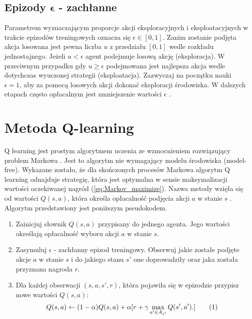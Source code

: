 \documentclass[12pt]{book}
\theoremstyle{plain}
\newcommand\addtag{\refstepcounter{equation}
\renewcommand{\labelenumii}{\theenumii}
\renewcommand{\theenumii}{\theenumi.\arabic{enumii}.}
\tag{\theequation}}
\newcommand{\myref}[1]{(\ref{#1})}
\begin{document}
\subsection*{Epizody $\mathbf{\epsilon}$ - zachłanne}
Parametrem wyznaczającym proporcje akcji eksploracyjnych i eksploatacyjnych w trakcie epizodów treningowych oznacza się $\epsilon \in [0,1]$. Zanim zostanie podjęta akcja losowana jest pewna liczba $u$ z przedziału $[0,1]$ wedle rozkładu jednostajnego. Jeżeli $u<\epsilon$ agent podejmuje losową akcję (eksploracja). W przeciwnym przypadku gdy $u \geq \epsilon$ podejmowana jest najlepsza akcja wedle dotychczas wyuczonej strategii (eksploatacja). Zazwyczaj na początku nauki $\epsilon=1$, aby za pomocą losowych akcji dokonać eksploracji środowiska. W dalszych etapach często opłacalnym jest zmniejszenie wartości $\epsilon$ \cite{epsilon_decay}.

\section{Metoda Q-learning}
Q learning jest prostym algorytmem uczenia ze wzmocnieniem rozwiązujący problem Markowa \cite{watkins}. Jest to algorytm nie wymagający modelu środowiska (model-free). Wykazane zostało\cite{q_zbieznosc}, że dla skończonych procesów Markowa algorytm Q learning odnajduje strategię, która jest optymalna w sensie maksymalizacji wartości oczekiwanej nagród \myref{eq:Markov_maximize}. Nazwa metody wzięła się od wartości $Q(s,a)$, która określa opłacalność podjęcia akcji $a$ w stanie $s$ \cite{nazwa_q}. Algorytm przedstawiony jest poniższym pseudokodem.
\begin{enumerate}
	\item Zainicjuj słownik
	$Q(s,a)$ przypisany do jednego agenta. Jego wartości określają opłacalność wyboru akcji $a$ w stanie $s$.
	\item Zasymuluj $\epsilon$ - zachłanny epizod treningowy. Obserwuj jakie zostałe podjęte akcje $a$ w stanie $s$ i do jakiego stanu $s'$ one doprowadziły oraz jaka została przyznana nagroda $r$.
	\item Dla każdej obserwacji $(s,a,s',r)$, która pojawiła się w epizodzie przypisz nowe wartości $Q(s,a)$:
	\[Q(s,a) \leftarrow (1-\alpha)Q(s,a) + \alpha [r + \gamma \max_{a' \in A_{s'}} Q(s',a').] \addtag \label{eq:q_rozwoj} \]
\end{enumerate}
\end{document}
